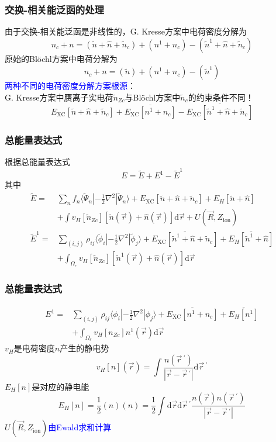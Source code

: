 \documentclass[cjk,slidestop,compress,mathserif,blue]{beamer}
\begin{document}
\frame
{
\frametitle{交换-相关能泛函的处理}
由于交换-相关能泛函是非线性的，\textrm{G. Kresse}方案中电荷密度分解为
\begin{displaymath}
	n_c+n=(\tilde n+\hat n+\tilde n_c)+(n^1+n_c)-(\tilde n^1+\hat n+\tilde n_c)
\end{displaymath}
原始的\textrm{Bl\"ochl}方案中电荷分解为
\begin{displaymath}
	n_c+n=(\tilde n)+(n^1+n_c)-(\tilde n^1)
\end{displaymath}
\textcolor{blue}{两种不同的电荷密度分解方案根源}：\\\textrm{G. Kresse}方案中赝离子实电荷$\tilde n_{Zc}$与\textrm{Bl\"ochl}方案中$\tilde n_c$的约束条件不同！
\begin{displaymath}
	E_{\mathrm{XC}}[\tilde n+\hat n+\tilde n_c]+\overline{E_{\mathrm{XC}}[n^1+n_c]}-\overline{E_{\mathrm{XC}}[\tilde n^1+\hat n+\tilde n_c]}
\end{displaymath}
}

\frame
{
	\frametitle{总能量表达式}
	根据总能量表达式$$E=\tilde E+E^1-\tilde E^1$$其中
	\begin{displaymath}
		\begin{aligned}
			\tilde E=&\sum_nf_n\langle\tilde\Psi_n|-\frac12\nabla^2|\tilde\Psi_n\rangle+E_{\mathrm{XC}}[\tilde n+\hat n+\tilde n_c]+E_H[\tilde n+\hat n]\\
			&+\int v_H[\tilde n_{Zc}][\tilde n(\vec r)+\hat n(\vec r)]\mathrm{d}\vec r+U(\vec R,Z_{\mathrm{ion}})\\
			\tilde E^1=&\sum_{(i,j)}\rho_{ij}\langle\tilde\phi_i|-\frac12\nabla^2|\tilde\phi_j\rangle+\overline{E_{\mathrm{XC}}[\tilde n^1+\hat n+\tilde n_c]}+\overline{E_H[\tilde n^1+\hat n]}\\
			&+\int_{\Omega_r}v_H[\tilde n_{Zc}][\tilde n^1(\vec r)+\hat n(\vec r)]\mathrm{d}\vec r
		\end{aligned}
	\end{displaymath}
}

\frame
{
	\frametitle{总能量表达式}
	\begin{displaymath}
		\begin{aligned}
			E^1=&\sum_{(i,j)}\rho_{ij}\langle\phi_i|-\frac12\nabla^2|\phi_j\rangle+\overline{E_{\mathrm{XC}}[n^1+n_c]}+\overline{E_H[n^1]}\\
			&+\int_{\Omega_r}v_H[n_{Zc}]n^1(\vec r)\mathrm{d}\vec r
		\end{aligned}
	\end{displaymath}
	$v_H$是电荷密度$n$产生的静电势
	$$v_H[n](\vec r)=\int\dfrac{n(\vec r\,^{\prime})}{|\vec r-\vec r\,^{\prime}|}\mathrm{d}\vec r\,^{\prime}$$
	$E_H[n]$是对应的静电能
	$$E_H[n]=\dfrac12(n)(n)=\dfrac12\int\mathrm{d}\vec r\mathrm{d}\vec r\,^{\prime}\dfrac{n(\vec r)n(\vec r\,^{\prime})}{|\vec r-\vec r\,^{\prime}|}$$ 
	$U(\vec R,Z_{\mathrm{ion}})$\textcolor{blue}{由\textrm{Ewald}求和计算}
}
\end{document}
